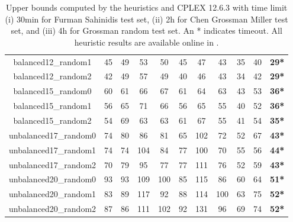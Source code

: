 \begin{table}
\begin{adjustbox}{center}
\begin{tabular}{|ccccccccccc|}
balanced12\_random1 & 45 & 49 & 53 & 50 & 45 & 47 & 43 & 35 & 40 & \textbf{29*} \\ 
balanced12\_random2 & 42 & 49 & 57 & 49 & 40 & 46 & 43 & 34 & 42 & \textbf{29*} \\ 
balanced15\_random0 & 60 & 61 & 66 & 67 & 61 & 64 & 63 & 43 & 53 & \textbf{36*} \\ 
balanced15\_random1 & 56 & 65 & 71 & 66 & 56 & 65 & 55 & 40 & 52 & \textbf{36*} \\ 
balanced15\_random2 & 54 & 69 & 63 & 63 & 61 & 67 & 55 & 41 & 54 & \textbf{35*} \\ 
unbalanced17\_random0 & 74 & 80 & 86 & 81 & 65 & 102 & 72 & 52 & 67 & \textbf{43*} \\ 
unbalanced17\_random1 & 74 & 74 & 104 & 84 & 77 & 100 & 70 & 55 & 56 & \textbf{44*} \\ 
unbalanced17\_random2 & 70 & 79 & 95 & 77 & 77 & 111 & 76 & 52 & 59 & \textbf{43*} \\ 
unbalanced20\_random0 & 93 & 93 & 109 & 100 & 85 & 115 & 86 & 60 & 64 & \textbf{51*} \\ 
unbalanced20\_random1 & 83 & 89 & 117 & 92 & 88 & 114 & 100 & 63 & 75 & \textbf{52*} \\ 
unbalanced20\_random2 & 87 & 86 & 111 & 102 & 92 & 131 & 96 & 69 & 74 & \textbf{52*} \\ 
\hline 
\end{tabular} 
\end{adjustbox} 
\vspace*{-0.2cm} 
\caption{Upper bounds computed by the heuristics and CPLEX 12.6.3 with time limit (i) 30min for Furman Sahinidis test set, (ii) 2h for Chen Grossman Miller test set, and (iii) 4h for Grossman random test set. An * indicates timeout. All heuristic results are available online in \cite{source_code}.} 
\label{Table:Heuristic_Upper_Bounds} 
\end{table} 
